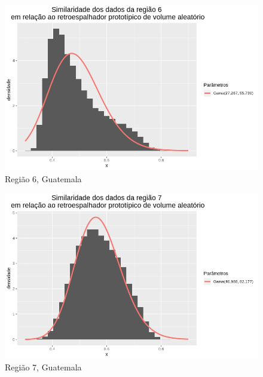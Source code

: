 \documentclass[12pt]{article}
\begin{document}
\begin{figure}[!h]
    \centering
    \includegraphics[width = 0.95\linewidth]{../../Images/Report_18_12_17/rv_region6.png}
    \caption{Região 6, Guatemala}
    \label{fig:rv_r6}
\end{figure}

\begin{figure}[!h]
    \centering
    \vspace{0.05\linewidth}
    \includegraphics[width = 0.95\linewidth]{../../Images/Report_18_12_17/rv_region7.png}
    \caption{Região 7, Guatemala}
    \label{fig:rv_r7}
\end{figure}
\end{document}
